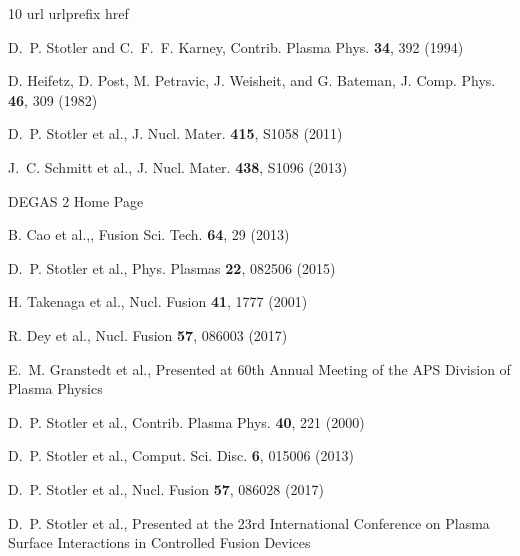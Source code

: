 \documentclass[11pt]{article}
\begin{document}
\begin{thebibliography}{10}
\expandafter\ifx\csname url\endcsname\relax
  \def\url#1{\texttt{#1}}\fi
\expandafter\ifx\csname urlprefix\endcsname\relax\def\urlprefix{URL }\fi
\expandafter\ifx\csname href\endcsname\relax
  \def\href#1#2{#2} \def\path#1{#1}\fi

 D.~P. Stotler and C.~F.~F. Karney, 
\href{http://dx.doi.org/10.1002/ctpp.2150340246}{Contrib. Plasma Phys. {\bf 34}, 392 (1994)}

D. Heifetz, D. Post, M. Petravic, J. Weisheit, and 
G. Bateman, 
\href{https://doi.org/10.1016/0021-9991(82)90017-1}{J. Comp. Phys. {\bf 46}, 309 (1982)}

D.~P. Stotler et al., \href{http://dx.doi.org/10.1016/j.jnucmat.2010.11.070}{J. Nucl. 
Mater. {\bf 415}, S1058 (2011)}

J.~C. Schmitt et al., 
\href{http://dx.doi.org/10.1016/j.jnucmat.2013.01.241}{J. Nucl. Mater. {\bf 438}, S1096 (2013)}

\href{https://w3.pppl.gov/degas2/}{DEGAS 2 Home Page}

B. Cao et al.,, \href{https://doi.org/10.13182/FST13-A17044}{Fusion Sci. Tech.
{\bf 64}, 29 (2013)}

D.~P. Stotler et al., \href{http://dx.doi.org/10.1063/1.4928372}{Phys. Plasmas {\bf 22},
082506 (2015)}

H. Takenaga et al., \href{https://doi.org/10.1088/0029-5515/41/12/305}{Nucl. Fusion
{\bf 41}, 1777 (2001)}

R. Dey et al., \href{https://doi.org/10.1088/1741-4326/aa739c}{Nucl. Fusion
{\bf 57}, 086003 (2017)}

E.~M. Granstedt et al., \href{http://meetings.aps.org/Meeting/DPP18/Session/PP11.83}{Presented
at 60th Annual Meeting of the APS Division of Plasma Physics}

D.~P. Stotler et al., \href{https://doi.org/10.1002/1521-3986(200006)40:3/4<221::AID-CTPP221>3.0.CO;2-L}{Contrib.
Plasma Phys. {\bf 40}, 221 (2000)}

D.~P. Stotler et al., \href{http://dx.doi.org/10.1088/1749-4699/6/1/015006}{Comput.
Sci. Disc. {\bf 6}, 015006 (2013)}

D.~P. Stotler et al., \href{https://doi.org/10.1088/1741-4326/aa7807}{Nucl. Fusion
{\bf 57}, 086028 (2017)}

D.~P. Stotler et al., \href{https://psi2018.princeton.edu/}{Presented at the 23rd
International Conference on Plasma Surface Interactions in Controlled
Fusion Devices}












\end{thebibliography}  
\end{document}
